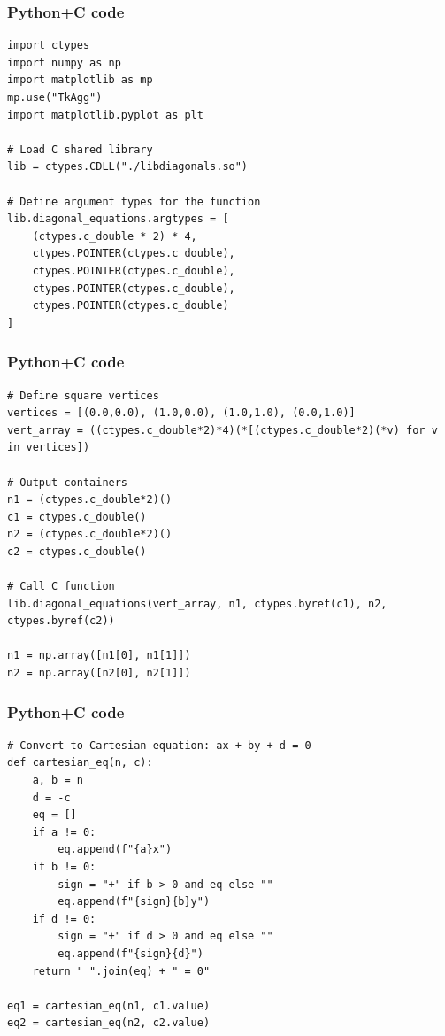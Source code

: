 \documentclass{beamer}
\begin{document}
\begin{frame}[fragile]
    \frametitle{Python+C code}

    \begin{lstlisting}
import ctypes
import numpy as np
import matplotlib as mp
mp.use("TkAgg")
import matplotlib.pyplot as plt

# Load C shared library
lib = ctypes.CDLL("./libdiagonals.so")

# Define argument types for the function
lib.diagonal_equations.argtypes = [
    (ctypes.c_double * 2) * 4,
    ctypes.POINTER(ctypes.c_double),
    ctypes.POINTER(ctypes.c_double),
    ctypes.POINTER(ctypes.c_double),
    ctypes.POINTER(ctypes.c_double)
]

    \end{lstlisting}
\end{frame}

\begin{frame}[fragile]
    \frametitle{Python+C code}

    \begin{lstlisting}
# Define square vertices
vertices = [(0.0,0.0), (1.0,0.0), (1.0,1.0), (0.0,1.0)]
vert_array = ((ctypes.c_double*2)*4)(*[(ctypes.c_double*2)(*v) for v in vertices])

# Output containers
n1 = (ctypes.c_double*2)()
c1 = ctypes.c_double()
n2 = (ctypes.c_double*2)()
c2 = ctypes.c_double()

# Call C function
lib.diagonal_equations(vert_array, n1, ctypes.byref(c1), n2, ctypes.byref(c2))

n1 = np.array([n1[0], n1[1]])
n2 = np.array([n2[0], n2[1]])

    \end{lstlisting}
\end{frame}

\begin{frame}[fragile]
    \frametitle{Python+C code}

    \begin{lstlisting}
# Convert to Cartesian equation: ax + by + d = 0
def cartesian_eq(n, c):
    a, b = n
    d = -c
    eq = []
    if a != 0:
        eq.append(f"{a}x")
    if b != 0:
        sign = "+" if b > 0 and eq else ""
        eq.append(f"{sign}{b}y")
    if d != 0:
        sign = "+" if d > 0 and eq else ""
        eq.append(f"{sign}{d}")
    return " ".join(eq) + " = 0"

eq1 = cartesian_eq(n1, c1.value)
eq2 = cartesian_eq(n2, c2.value)


    \end{lstlisting}
\end{frame}
\end{document}
